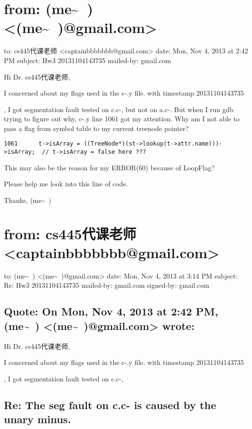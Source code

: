 \documentclass[12pt]{book}
\begin{document}
\section{from:         (me\textasciitilde{}~) <(me\textasciitilde{}~)@gmail.com>}
\label{sec-28-3}
to:         cs445代课老师 <captainbbbbbbb@gmail.com>
date:         Mon, Nov 4, 2013 at 2:42 PM
subject:         Hw3  20131104143735
mailed-by:         gmail.com

Hi Dr. cs445代课老师, 

I concerned about my flags used in the c-.y file. with timestamp 
20131104143735

, I got segmentation fault tested on c.c-, but not on a.c-. But when I run gdb trying to figure out why, c-.y line 1061 got my attention.  Why am I not able to pass a flag from symbol table to my current treenode pointer?
\lstset{language=java,label= ,caption= ,numbers=none}
\begin{lstlisting}
1061	  t->isArray = ((TreeNode*)(st->lookup(t->attr.name)))->isArray;  // t->isArray = false here ???
\end{lstlisting}

This may also be the reason for my ERROR(60) because of LoopFlag?

Please help me look into this line of code.  

Thanks,
(me\textasciitilde{}~)

\section{from:         cs445代课老师 <captainbbbbbbb@gmail.com>}
\label{sec-28-4}
to:         (me\textasciitilde{}~) <(me\textasciitilde{}~)@gmail.com>
date:         Mon, Nov 4, 2013 at 3:14 PM
subject:         Re: Hw3  20131104143735
mailed-by:         gmail.com
signed-by:         gmail.com

\subsection{Quote: On Mon, Nov 4, 2013 at 2:42 PM, (me\textasciitilde{}~) <(me\textasciitilde{}~)@gmail.com> wrote:}
\label{sec-28-4-1}
Hi Dr. cs445代课老师, 

I concerned about my flags used in the c-.y file. with timestamp 
20131104143735

, I got segmentation fault tested on c.c-,

\subsection{Re: The seg fault on c.c- is caused by the unary minus.}
\label{sec-28-4-2}
\end{document}
